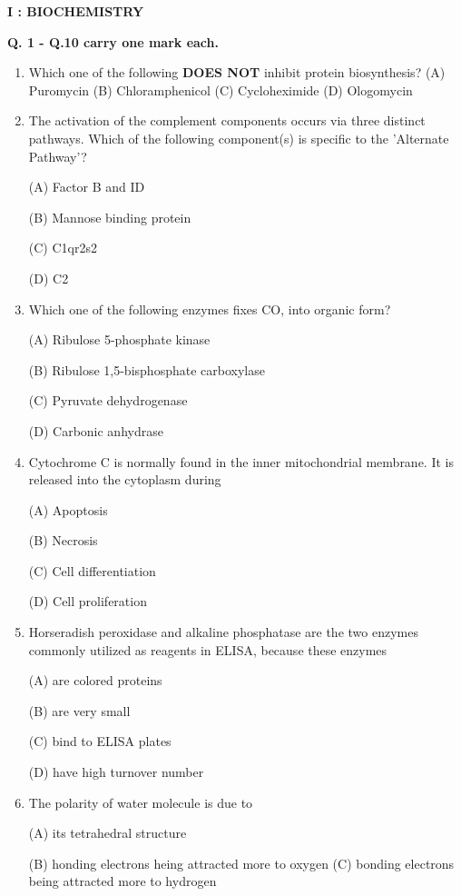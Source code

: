 \documentclass[journal]{IEEEtran}
\begin{document}
\begin{center}
\textbf{ I : BIOCHEMISTRY}

\textbf{Q. 1 - Q.10 carry one mark each.}

\end{center}
\begin{enumerate}
	\item {Which one of the following \textbf{DOES NOT} inhibit protein biosynthesis? 
	(A) Puromycin	(B) Chloramphenicol	(C) Cycloheximide	(D) Ologomycin}
\item {The activation of the complement components occurs via three distinct pathways. Which of the following component(s) is specific to the 'Alternate Pathway'?

(A) Factor B and ID

(B) Mannose binding protein

(C) C1qr2s2

		(D) C2}

	\item {Which one of the following enzymes fixes CO, into organic form?

(A) Ribulose 5-phosphate kinase

(B) Ribulose 1,5-bisphosphate carboxylase

(C) Pyruvate dehydrogenase

		(D) Carbonic anhydrase}

	\item {Cytochrome C is normally found in the inner mitochondrial membrane. It is released into the cytoplasm during

(A) Apoptosis

(B) Necrosis

(C) Cell differentiation

		(D) Cell proliferation}

	\item{ Horseradish peroxidase and alkaline phosphatase are the two enzymes commonly utilized as reagents in ELISA, because these enzymes

(A) are colored proteins

(B) are very small

(C) bind to ELISA plates

(D) have high turnover number}

	\item {The polarity of water molecule is due to

(A) its tetrahedral structure

(B) honding electrons heing attracted more to oxygen 
(C) bonding electrons being attracted more to hydrogen

}
\end{enumerate}
\end{document}
